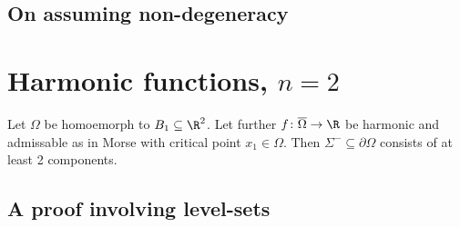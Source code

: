 \subsection*{On assuming non-degeneracy}

\newpage

\section*{Harmonic functions, $n=2$}

\begin{claim}
  Let $\Omega$ be homoemorph to $B_1\subseteq\R^2$. Let further $f\colon\overline{\Omega}\to\R$ be harmonic and admissable 
  as in Morse with critical point $x_1\in\Omega$. Then $\Sigma^-\subseteq\partial\Omega$ consists of at least 2 components.
\end{claim}


\subsection*{A proof involving level-sets}

